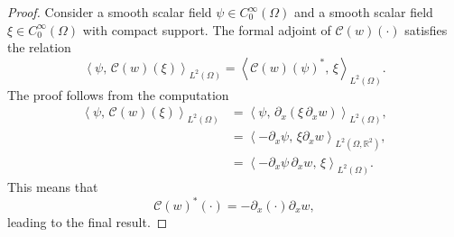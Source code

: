 \documentclass{ifacconf}
\newcommand{\bbR}{\mathbb{R}}
\newcommand{\inner}[3][]{\ensuremath{\left\langle #2, \, #3 \right\rangle_{#1}}}
\newtheorem{proof}{Proof}
\begin{document}
\begin{proof}
	Consider a smooth scalar field  $\psi \in C^\infty_0(\Omega)$ and a smooth scalar field $\xi \in C^\infty_0(\Omega)$ with compact support. The formal adjoint of $\mathcal{C}(w)(\cdot)$ satisfies the relation
	\begin{equation}
		\inner[L^2(\Omega)]{\psi}{\mathcal{C}(w)(\xi)} = \inner[L^2(\Omega)]{\mathcal{C}(w)(\psi)^*}{\xi}.
	\end{equation}
	The proof follows from the computation
	\begin{equation}
		\begin{aligned}
			\inner[L^2(\Omega)]{\psi}{\mathcal{C}(w)(\xi)} &= \inner[L^2(\Omega)]{\psi}{\partial_x(\xi \, \partial_x w)}, \\
			&= \inner[L^2(\Omega, \bbR^2)]{-\partial_x \psi}{\xi \partial_x w}, \\
			&= \inner[L^2(\Omega)]{-\partial_x \psi \, \partial_x w}{\xi}.
		\end{aligned} 
	\end{equation}
	This means that
	\begin{equation}
		\mathcal{C}(w)^*(\cdot) = -\partial_x (\cdot) \partial_x w,
	\end{equation}
	leading to the final result.
\end{proof}
\end{document}
